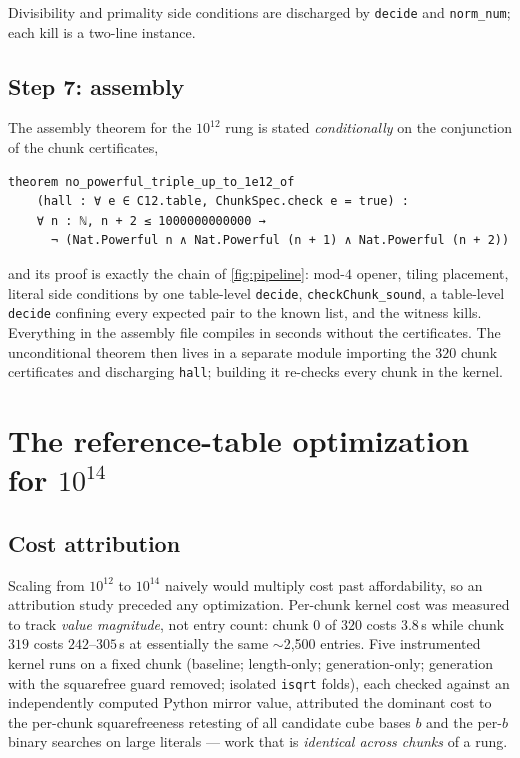 \documentclass[11pt]{article}
\theoremstyle{definition}
\theoremstyle{remark}
\newcommand{\code}[1]{\texttt{#1}}
\begin{document}
Divisibility and primality side conditions are discharged by
\code{decide} and \code{norm\_num}; each kill is a two-line instance.

\subsection{Step 7: assembly}\label{sec:assembly}

The assembly theorem for the $10^{12}$ rung is stated \emph{conditionally}
on the conjunction of the chunk certificates,

\begin{lstlisting}
theorem no_powerful_triple_up_to_1e12_of
    (hall : ∀ e ∈ C12.table, ChunkSpec.check e = true) :
    ∀ n : ℕ, n + 2 ≤ 1000000000000 →
      ¬ (Nat.Powerful n ∧ Nat.Powerful (n + 1) ∧ Nat.Powerful (n + 2))
\end{lstlisting}

and its proof is exactly the chain of \cref{fig:pipeline}: mod-$4$
opener, tiling placement, literal side conditions by one table-level
\code{decide}, \code{checkChunk\_sound}, a table-level \code{decide}
confining every expected pair to the known list, and the witness kills.
Everything in the assembly file compiles in seconds without the
certificates. The unconditional theorem then lives in a separate module
importing the $320$ chunk certificates and discharging \code{hall};
building it re-checks every chunk in the kernel.

\section{The reference-table optimization for $10^{14}$}\label{sec:table}

\subsection{Cost attribution}

Scaling from $10^{12}$ to $10^{14}$ naively would multiply cost past
affordability, so an attribution study preceded any optimization.
Per-chunk kernel cost was measured to track \emph{value magnitude}, not
entry count: chunk $0$ of $320$ costs $3.8$\,s while chunk $319$ costs
$242$--$305$\,s at essentially the same $\sim$2{,}500 entries. Five
instrumented kernel runs on a fixed chunk (baseline; length-only;
generation-only; generation with the squarefree guard removed; isolated
\code{isqrt} folds), each checked against an independently computed
Python mirror value, attributed the dominant cost to the per-chunk
squarefreeness retesting of all candidate cube bases $b$ and the per-$b$
binary searches on large literals --- work that is \emph{identical across
chunks} of a rung.
\end{document}
